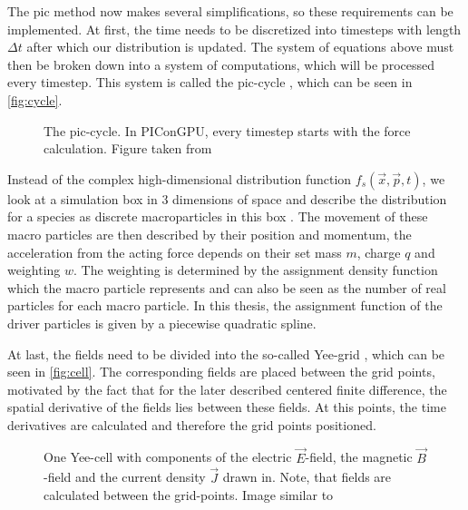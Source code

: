 \documentclass[bachelor_thesis]{subfiles}
\begin{document}
The \gls{pic} method now makes several simplifications, so these requirements can be implemented.
At first, the time needs to be discretized into timesteps with length $\Delta t$ after which our distribution is updated. The system of equations above must then be broken down into a system of computations, which will be processed every timestep.
This system is called the \gls{pic}-cycle \cite{Huebl2019}, which can be seen in \autoref{fig:cycle}.

\begin{figure}
	\centering
	\resizebox{0.8\textwidth}{!}{}
	\caption{The \gls{pic}-cycle. In PIConGPU, every timestep starts with the force calculation. Figure taken from \cite{Pausch2019}}
	\label{fig:cycle}
\end{figure}

Instead of the complex high-dimensional distribution function $f_s(\vec{x}, \vec{p}, t)$, we look at a simulation box in 3 dimensions of space and describe the distribution for a species as discrete macroparticles in this box \cite{Burau2010}.
The movement of these macro particles are then described by their position and momentum, the acceleration from the acting force depends on their set mass $m$, charge $q$ and weighting $w$.
The weighting is determined by the assignment density function which the macro particle represents and can also be seen as the number of real particles for each macro particle.
In this thesis, the assignment function of the driver particles is given by a piecewise quadratic spline.

At last, the fields need to be divided into the so-called Yee-grid \cite{Yee1966}, which can be seen in \autoref{fig:cell}. The corresponding fields are placed between the grid points, motivated by the fact that for the later described centered finite difference, 
the spatial derivative of the fields lies between these fields. At this points, the time derivatives are calculated and therefore the grid points positioned.

\begin{figure}
	\centering
	\resizebox{0.8\textwidth}{!}{}
	\caption{One Yee-cell with components of the electric $\vec{E}$-field, the magnetic $\vec{B}$-field and the current density $\vec{J}$ drawn in. Note, that fields are calculated between the grid-points. Image similar to \cite{PICRepo}}
	\label{fig:cell}
\end{figure}
\end{document}
